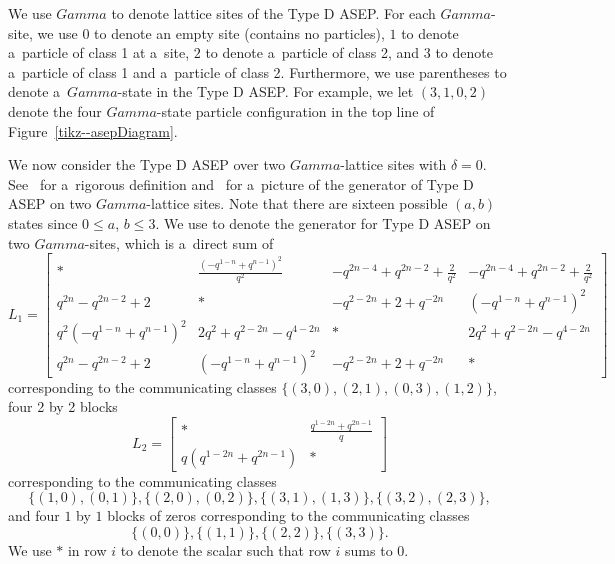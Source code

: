 \documentclass[10pt,a4paper]{amsart}
\numberwithin{equation}{section}
\theoremstyle{definition}
\def\Gamma{Gamma}
\begin{document}
We use $\Gamma$ to denote lattice sites of the Type D ASEP. For each $\Gamma$-site, we use $0$ to denote an empty site (contains no particles), $1$ to denote a~particle of class 1 at a~site, $2$ to denote a~particle of class 2, and $3$ to denote a~particle of class 1 and a~particle of class 2. Furthermore, we use parentheses to denote a~$\Gamma$-state in the Type D ASEP. For example, we let $(3,1,0,2)$ denote the four $\Gamma$-state particle configuration in the top line of Figure~\ref{tikz--asepDiagram}.

We now consider the Type D ASEP over two $\Gamma$-lattice sites with $\delta = 0$. See~\cite{rohr2023type} for a~rigorous definition and~\cite{kuan2020interactingparticlesystemstype} for a~picture of the generator of Type D ASEP on two $\Gamma$-lattice sites. Note that there are sixteen possible $(a,b)$ states since $0 \leq a$, $b \leq 3$. We use  to denote the generator for Type D ASEP on two $\Gamma$-sites, which is a~direct sum of
\[
L_1 =
\left[\begin{smallmatrix}
* & \frac{(- q^{1 - n} + q^{n - 1})^{2}}{q^{2}} & - q^{2 n - 4} + q^{2 n - 2} + \frac{2}{q^{2}} & - q^{2 n - 4} + q^{2 n - 2} + \frac{2}{q^{2}}
\\q^{2 n} - q^{2 n - 2} + 2 & * & - q^{2 - 2 n} + 2 + q^{- 2 n} & (- q^{1 - n} + q^{n - 1})^{2}
\\
q^{2} (- q^{1 - n} + q^{n - 1})^{2} & 2 q^{2} + q^{2 - 2 n} - q^{4 - 2 n} & * & 2 q^{2} + q^{2 - 2 n} - q^{4 - 2 n}
\\q^{2 n} - q^{2 n - 2} + 2 & (- q^{1 - n} + q^{n - 1})^{2} & - q^{2 - 2 n} + 2 + q^{- 2 n} & *
\end{smallmatrix}\right]
\]
corresponding to the communicating classes $\{(3,0),(2,1),(0,3),(1,2)\}$, four 2 by 2 blocks
\[L_2 = \begin{bmatrix} * & \frac{q^{1 - 2 n} + q^{2 n - 1}}{q}\\q \left(q^{1 - 2 n} + q^{2 n - 1}\right) & * \end{bmatrix}\]
corresponding to the communicating classes \[\{(1,0),(0,1)\},\{(2,0),(0,2)\},\{(3,1),(1,3)\},\{(3,2),(2,3)\},\] and four $1$ by $1$ blocks of zeros corresponding to the communicating classes \[\{(0,0)\},\{(1,1)\},\{(2,2)\},\{(3,3)\}.\] We use $*$ in row $i$ to denote the scalar such that row $i$ sums to 0.
\end{document}
